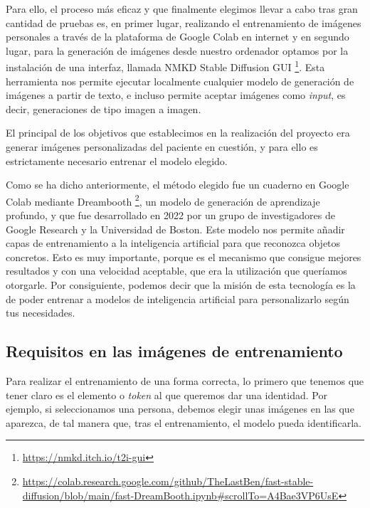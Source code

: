 Para ello, el proceso más eficaz y que finalmente elegimos llevar a cabo tras gran cantidad de pruebas es, en primer lugar, realizando el entrenamiento de imágenes personales a través de la plataforma de Google Colab en internet y en segundo lugar, para la generación de imágenes desde nuestro ordenador optamos por la instalación de una interfaz, llamada NMKD Stable Diffusion GUI \footnote{\url{https://nmkd.itch.io/t2i-gui}}. Esta herramienta nos permite ejecutar localmente cualquier modelo de generación de imágenes a partir de texto, e incluso permite aceptar imágenes como \textit{input}, es decir, generaciones de tipo imagen a imagen. 

El principal de los objetivos que establecimos en la realización del proyecto era generar imágenes personalizadas del paciente en cuestión, y para ello es estrictamente necesario entrenar el modelo elegido.

Como se ha dicho anteriormente, el método elegido fue un cuaderno en Google Colab mediante Dreambooth \footnote{\url{https://colab.research.google.com/github/TheLastBen/fast-stable-diffusion/blob/main/fast-DreamBooth.ipynb#scrollTo=A4Bae3VP6UsE}},  un modelo de generación de aprendizaje profundo, y que fue desarrollado en 2022 por un grupo de investigadores de Google Research y la Universidad de Boston.  Este modelo nos permite añadir capas de entrenamiento a la inteligencia artificial para que reconozca objetos concretos. Esto es muy importante, porque es el mecanismo que consigue mejores resultados y con una velocidad aceptable, que era la utilización que queríamos otorgarle. Por consiguiente, podemos decir que la misión de esta tecnología es la de poder entrenar a modelos de inteligencia artificial para personalizarlo según tus necesidades.

\subsection{Requisitos en las imágenes de entrenamiento}

Para realizar el entrenamiento de una forma correcta, lo primero que tenemos que tener claro es  el elemento o \textit{token} al que queremos dar una identidad. Por ejemplo, si seleccionamos una persona, debemos elegir unas imágenes en las que aparezca, de tal manera que, tras el entrenamiento, el modelo pueda identificarla. 

